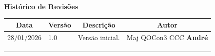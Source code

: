 \begin{table}[h]
	\begin{center}
	    \textbf{\Huge{Histórico de Revisões}}
	\end{center}
    \centering
	\begin{tabular}{|p{3cm}|p{1.5cm}|p{7.5cm}|p{3.2cm}|}
		\hline \multicolumn{1}{|c|}{\textbf{Data}} & \multicolumn{1}{|c|}{\textbf{Versão}} &
			\multicolumn{1}{|c|}{\textbf{Descrição}} & \multicolumn{1}{|c|}{\textbf{Autor}} \\ \hline
		28/01/2026 & 1.0 & Versão inicial. & Maj QOCon3 CCC \textbf{André} \\ \hline
		& & & \\ \hline
		& & & \\ \hline
		& & & \\ \hline
	\end{tabular}
\end{table}